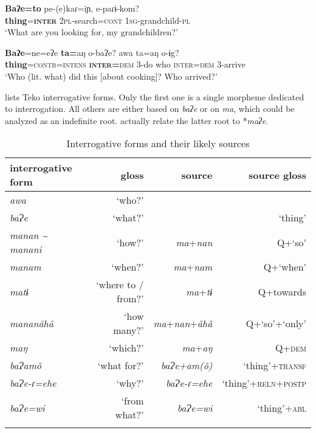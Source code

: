 \documentclass[output=paper]{langscibook}
\begin{document}
\ea  \label{ex:rose:17}
\gll \textbf{Baʔe=to}   pe-(e)kaɾ=iɲ,   e-paɾɨ-kom?\\
\textbf{thing}=\textbf{\textsc{inter}}  \textsc{2pl}{}-search=\textsc{cont}  \textsc{1sg}{}-grandchild-\textsc{pl}\\
\glt ‘What are you looking for, my grandchildren?’   
\z 

\ea \label{ex:rose:18}
\gll \textbf{Baʔe}=ne=eʔe  \textbf{ta=}aŋ  o-baʔe?  awa ta=aŋ  o-ɨg?\\
\textbf{thing}=\textsc{contr}=\textsc{intens}  \textbf{\textsc{inter=}}\textsc{dem}  3-do    who  \textsc{inter=dem}  3-arrive\\
\glt ‘Who (lit. what) did this [about cooking]? Who arrived?’ 
\z 

 lists Teko interrogative forms. Only the first one is a single morpheme dedicated to interrogation. All others are either based on \textit{baʔe} or on \textit{ma}, which could be analyzed as an indefinite root. \citet[74]{AuweraAuwera2021} actually relate the latter root to *\textit{maʔe}. 

\begin{table}
\small
\begin{tabular}{lrrr}
\lsptoprule
interrogative form & gloss & source & source gloss\\
\midrule
\textit{awa} & ‘who?’ &  & \\
\textit{baɁe} & ‘what?’ &  & ‘thing’\\
\textit{manan {\textasciitilde} manani} & ‘how?’ & \textit{ma}+\textit{nan} & Q+‘so’\\
\textit{manam}  & ‘when?’ & \textit{ma}+\textit{nam} & Q+‘when’\\
\textit{matɨ} & ‘where to / from?’ & \textit{ma}+\textit{tɨ}  & Q+towards\\
\textit{mananãhã} & ‘how many?’ & \textit{ma}+\textit{nan}+\textit{ãhã} & Q+‘so’+‘only’\\
\textit{maŋ} & ‘which?’ & \textit{ma}+\textit{aŋ} & Q+\textsc{dem}\\
\textit{baɁamõ}  & ‘what for?’ & \textit{baɁe+am(õ)} & ‘thing’+\textsc{transf}\\
\textit{baɁe-ɾ=ehe} & ‘why?’ & \textit{baɁe-ɾ=ehe} & ‘thing’+\textsc{reln}+\textsc{postp}\\
\textit{baɁe=wi}  & ‘from what?’ & \textit{baɁe=wi}  & ‘thing’+\textsc{abl}\\
\lspbottomrule
\end{tabular}
\caption{\label{tab:rose:2}Interrogative forms and their likely sources}
\end{table}
\end{document}
